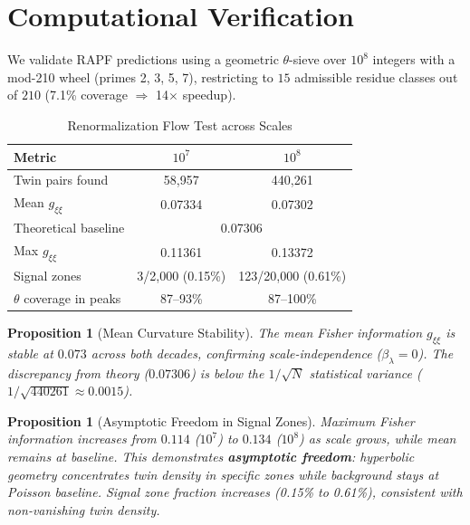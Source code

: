 \documentclass[12pt]{article}
\newtheorem{proposition}[theorem]{Proposition}
\begin{document}
\section{Computational Verification}
\label{sec:computation}

We validate RAPF predictions using a geometric $\theta$-sieve over $10^8$
integers with a mod-210 wheel (primes 2, 3, 5, 7), restricting to $15$
admissible residue classes out of $210$ (7.1\% coverage $\Rightarrow$ 14$\times$ speedup).

\begin{table}[htbp]
\centering
\caption{Renormalization Flow Test across Scales}
\label{tab:renormalization}
\begin{tabular}{lcc}
\hline
\textbf{Metric} & \textbf{$10^7$} & \textbf{$10^8$} \\
\hline
Twin pairs found & 58,957 & 440,261 \\
Mean $g_{\xi\xi}$ & 0.07334 & 0.07302 \\
Theoretical baseline & \multicolumn{2}{c}{0.07306} \\
Max $g_{\xi\xi}$ & 0.11361 & 0.13372 \\
Signal zones & 3/2,000 (0.15\%) & 123/20,000 (0.61\%) \\
$\theta$ coverage in peaks & 87--93\% & 87--100\% \\
\hline
\end{tabular}
\end{table}

\begin{proposition}[Mean Curvature Stability]
The mean Fisher information $g_{\xi\xi}$ is stable at $0.073$ across both
decades, confirming scale-independence ($\beta_\lambda = 0$). The discrepancy
from theory ($0.07306$) is below the $1/\sqrt{N}$ statistical variance
($1/\sqrt{440261} \approx 0.0015$).
\end{proposition}

\begin{proposition}[Asymptotic Freedom in Signal Zones]
Maximum Fisher information increases from $0.114$ ($10^7$) to $0.134$ ($10^8$)
as scale grows, while mean remains at baseline. This demonstrates
\textbf{asymptotic freedom}: hyperbolic geometry concentrates twin density in
specific zones while background stays at Poisson baseline. Signal zone fraction
increases (0.15\% to 0.61\%), consistent with non-vanishing twin density.
\end{proposition}
\end{document}
